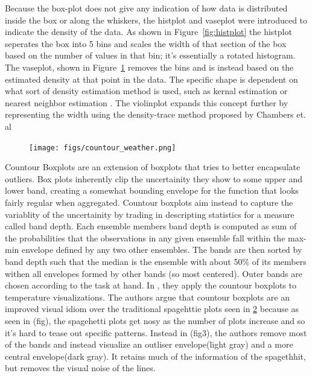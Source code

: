 \begin{figure}
\label{fig:histplot}
\label{fig:vase}
\end{figure}

Because the box-plot does not give any indication of how data is distributed
inside the box or along the whiskers, the histplot and vaseplot were introduced to indicate
the density of the data\cite{benjamini1988}. As shown in
Figure~\ref{fig:histplot} the histplot seperates the box
into  5 bins and scales the width of that section of the box based on the
number of values in that bin; it's essentially a rotated histogram. The
vaseplot, shown in Figure~\ref{fig:vase} removes the bins and is instead based
on the estimated density at that point in the data. The specific shape is
dependent on what sort of density estimation method is used, such as kernal
estimation or nearest neighbor estimation \cite{chambers1983}. The
violinplot \cite{hintz1998} expands this concept further by representing the
width using the density-trace method proposed by Chambers
et. al \cite{chambers1983}%








\begin{figure}
\texttt{[image: figs/countour\_weather.png]}
\label{fig:countour}
\end{figure}
Countour Boxplots \cite{whitaker13} are an extension of boxplots that tries to better encapsulate outliers. Box plots inherently clip the uncertainity they show to some upper and lower band, 
creating a somewhat bounding envelope for the function that looks fairly regular when aggregated. Countour boxplots aim instead to capture the variablity of the uncertainity by trading in descripting
statistics for a measure called band depth. Each ensemble members band depth is computed as sum of the probabilities that the observations in any given ensemble fall within the max-min envelope defined by any two other ensembles. The bands are then sorted by band depth such that the median is the ensemble with about 50\% of its members withen all envelopes formed by other bands (so most centered). Outer bands are chosen according to the task at hand. In \cite{whitaker13}, they apply the countour boxplots to temperature visualizations. %
The authors argue that countour boxplots are an improved visual idiom over the traditional spagehttie plots seen in \ref{fig:countour} because as seen in (fig), the spagehetti plots get nosy as the number of plots increase and so it's hard to tease out specific patterns. Instead in (fig3), the authors remove most of the bands and instead visualize an outliser envelope(light gray) and a more central envelope(dark gray). It retains much of the information of the spagethhit, but removes the visual noise of the lines.  

